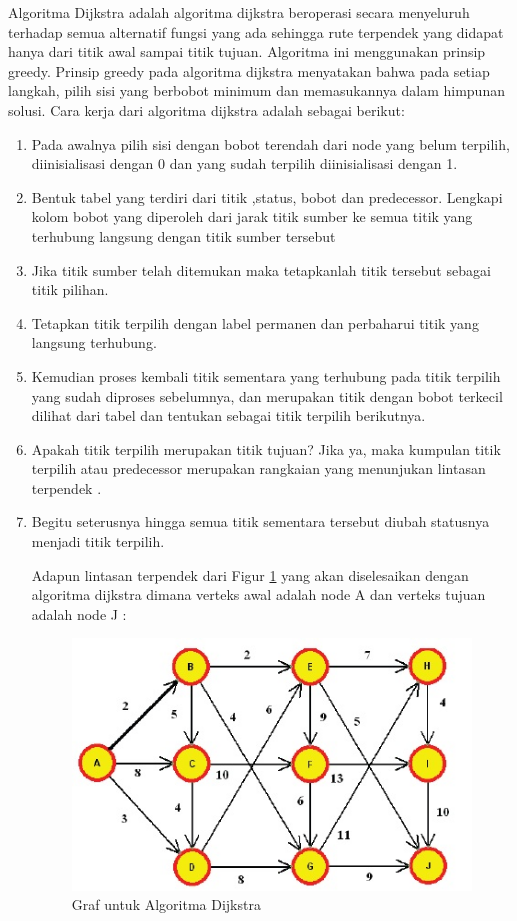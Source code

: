 Algoritma Dijkstra adalah algoritma dijkstra beroperasi secara menyeluruh terhadap semua alternatif fungsi yang ada sehingga rute terpendek yang didapat hanya dari titik awal sampai titik tujuan. Algoritma ini menggunakan prinsip greedy. Prinsip greedy pada algoritma dijkstra menyatakan bahwa pada setiap langkah,  pilih sisi yang berbobot minimum dan memasukannya dalam himpunan solusi. Cara kerja dari algoritma dijkstra adalah sebagai berikut:
\begin{enumerate}
\item Pada awalnya pilih sisi dengan bobot terendah dari node yang belum terpilih, diinisialisasi dengan 0 dan yang sudah terpilih diinisialisasi dengan 1.
\item Bentuk tabel yang terdiri dari titik ,status, bobot dan predecessor. Lengkapi kolom bobot yang diperoleh dari jarak titik sumber ke semua titik yang terhubung langsung dengan titik sumber tersebut
\item Jika titik sumber telah ditemukan maka tetapkanlah titik tersebut sebagai titik pilihan.
\item Tetapkan titik terpilih dengan label permanen dan perbaharui titik yang langsung terhubung.
\item Kemudian proses kembali titik sementara yang terhubung pada titik terpilih yang sudah diproses sebelumnya, dan merupakan titik dengan bobot terkecil dilihat dari tabel dan tentukan sebagai titik terpilih berikutnya.
\item Apakah titik terpilih merupakan titik tujuan? Jika ya, maka kumpulan titik terpilih atau predecessor merupakan rangkaian yang menunjukan lintasan terpendek .
\item Begitu seterusnya hingga semua titik sementara tersebut diubah statusnya menjadi titik terpilih.

Adapun lintasan terpendek dari Figur \ref{fig:Jalur terpendek} yang akan diselesaikan dengan algoritma dijkstra dimana verteks awal adalah node A dan verteks tujuan adalah node J :

\begin{figure}[htbp]
\begin{center}
	\includegraphics[scale=0.8]{fig/sunario-3/Graf.jpg}%
	\caption{Graf untuk Algoritma Dijkstra}%
	\label{fig:Jalur terpendek}%
\end{center}
\end{figure}


\end{enumerate}
